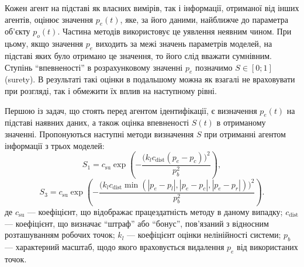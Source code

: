 \documentclass[a4paper,13pt]{atuaref}
\begin{document}
Кожен агент на підставі як власних вимірів, так і інформації, отриманої від
інших агентів, оцінює значення $p_e (t)$, яке, за його даними, найближче до
параметра об'єкту $p_o(t)$.
Частина методів використовує це уявлення неявним чином. При цьому,
якщо значення $ p_e $ виходить за межі значень параметрів моделей, на підставі
яких було отримано це значення, то його слід вважати сумнівним.
Ступінь ``впевненості'' в розрахунковому значенні $p_e$ позначимо $ S \in [0; 1] $ (surety).
В результаті такі оцінки в подальшому можна як
взагалі не враховувати при розгляді, так і обмежити їх вплив на наступному
рівні.


Першою із задач, що стоять перед агентом ідентифікації, є визначення $ p_e(t) $
на підставі наявних даних, а також оцінка впевненості $ S(t) $ в
отриманому значенні.
Пропонуються наступні
методи визначення $S$ при отриманні агентом інформації з трьох моделей:
%
\begin{equation}
  S_1 = c_\mathrm{su} \exp \left( - \frac{ \big( k_l c_\mathrm{dist} ( p_e - p_c ) \big)^2 }{p_b^2} \right)
  ,
  \label{atu:eq:S1}
\end{equation}
%
\begin{equation}
  S_3 = c_\mathrm{su} \exp \left( - \frac{ \big( k_l c_\mathrm{dist} \min( |p_e - p_l|,|p_e - p_c|, |p_e - p_r| ) \big)^2 }{p_b^2} \right)
  .
  \label{atu:eq:S3}
\end{equation}
%
де
$c_\mathrm{su}$ ---
коефіцієнт, що відображає працездатність методу в даному випадку;
$c_\mathrm{dist}$ ---
коефіцієнт, що визначає ``штраф'' або ``бонус'', пов'язаний з відносним розташуванням робочих точок;
$k_l$ ---
коефіцієнт оцінки нелінійності системи;
$p_b$
--- характерний масштаб, щодо якого враховується видалення $ p_e $ від використаних точок.

\end{document}
